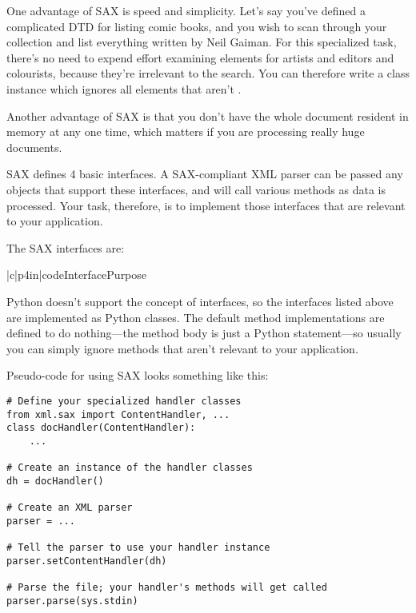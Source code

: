 \documentclass{howto}
\newcommand{\element}[1]{\code{#1}}
\begin{document}
One advantage of SAX is speed and simplicity.  Let's say
you've defined a complicated DTD for listing comic books, and you wish
to scan through your collection and list everything written by Neil
Gaiman.  For this specialized task, there's no need to expend effort
examining elements for artists and editors and colourists, because
they're irrelevant to the search.  You can therefore write a class
instance which ignores all elements that aren't \element{writer}.

Another advantage of SAX is that you don't have the whole document
resident in memory at any one time, which matters if you are
processing really huge documents.  

SAX defines 4 basic interfaces. A SAX-compliant XML parser can be
passed any objects that support these interfaces, and will call
various methods as data is processed.  Your task, therefore, is to
implement those interfaces that are relevant to your application.

The SAX interfaces are:

\begin{tableii}{|c|p{4in}|}{code}{Interface}{Purpose}





\end{tableii}

Python doesn't support the concept of interfaces, so the interfaces
listed above are implemented as Python classes.  The default method
implementations are defined to do nothing---the method body is just a
Python  statement---so usually you can simply ignore methods
that aren't relevant to your application. 

Pseudo-code for using SAX looks something like this:
\begin{verbatim}
# Define your specialized handler classes
from xml.sax import ContentHandler, ...
class docHandler(ContentHandler):
    ...

# Create an instance of the handler classes
dh = docHandler()

# Create an XML parser
parser = ...

# Tell the parser to use your handler instance
parser.setContentHandler(dh)

# Parse the file; your handler's methods will get called
parser.parse(sys.stdin)
\end{verbatim}
\end{document}
